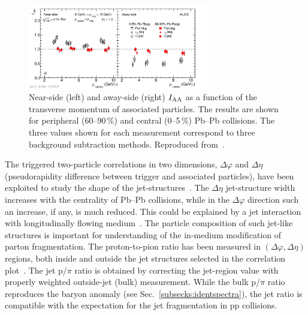 \begin{figure}
\centering
\includegraphics[width=0.7\textwidth]{particlefigs/IAA.pdf}
\caption{Near-side (left) and away-side (right) $I_{\rm AA}$ as a function of the transverse momentum of associated particles. The results are shown for peripheral (60--90\,\%) and central (0--5\,\%) Pb--Pb collisions. The three values shown for each measurement correspond to three background subtraction methods. Reproduced from~\cite{Aamodt:2011vg}.}
\label{figks:IAA}
\end{figure}

The triggered two-particle correlations in two dimensions, $\Delta\varphi$ and $\Delta\eta$ (pseudorapidity difference between trigger and associated particles), have been exploited to study the shape of the jet-structures~\cite{Morsch:2012gb}. The $\Delta\eta$ jet-structure width increases with the centrality of Pb--Pb collisions, while in the $\Delta\varphi$ direction such an increase, if any, is much reduced. This could be explained by a jet interaction with longitudinally flowing medium~\cite{Armesto:2004pt}. The particle composition of such jet-like structures is important for understanding of the in-medium modification of parton fragmentation. The proton-to-pion ratio has been measured in $(\Delta\varphi, \Delta\eta)$ regions, both inside and outside the jet structures selected in the correlation plot~\cite{Veldhoen:2012ge}. The jet p/$\pi$ ratio is obtained by correcting the jet-region value with properly weighted outside-jet (bulk) measurement. While the bulk p/$\pi$ ratio reproduces the baryon anomaly (see Sec.~\ref{subsecks:identspectra}), the jet ratio is compatible with the expectation for the jet fragmentation in pp collisions.
